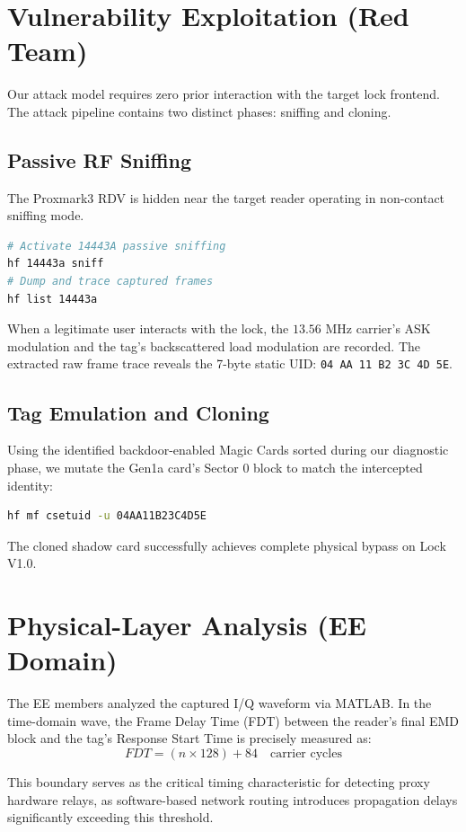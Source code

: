 \documentclass[sigconf]{acmart}
\begin{document}
\section{Vulnerability Exploitation (Red Team)}
Our attack model requires zero prior interaction with the target lock frontend. The attack pipeline contains two distinct phases: sniffing and cloning.

\subsection{Passive RF Sniffing}
The Proxmark3 RDV is hidden near the target reader operating in non-contact sniffing mode. 
\begin{lstlisting}[language=bash, caption={Proxmark3 Protocol Sniffing Execution}]
# Activate 14443A passive sniffing
hf 14443a sniff
# Dump and trace captured frames
hf list 14443a
\end{lstlisting}

When a legitimate user interacts with the lock, the $13.56\text{ MHz}$ carrier's ASK modulation and the tag's backscattered load modulation are recorded. The extracted raw frame trace reveals the 7-byte static UID: \texttt{04 AA 11 B2 3C 4D 5E}.

\subsection{Tag Emulation and Cloning}
Using the identified backdoor-enabled Magic Cards sorted during our diagnostic phase, we mutate the Gen1a card's Sector 0 block to match the intercepted identity:
\begin{lstlisting}[language=bash]
hf mf csetuid -u 04AA11B23C4D5E
\end{lstlisting}
The cloned shadow card successfully achieves complete physical bypass on Lock V1.0.

\section{Physical-Layer Analysis (EE Domain)}
The EE members analyzed the captured I/Q waveform via MATLAB. In the time-domain wave, the Frame Delay Time (FDT) between the reader's final EMD block and the tag's Response Start Time is precisely measured as:
$$FDT = (n \times 128) + 84 \quad \text{carrier cycles}$$

This boundary serves as the critical timing characteristic for detecting proxy hardware relays, as software-based network routing introduces propagation delays significantly exceeding this threshold.
\end{document}
